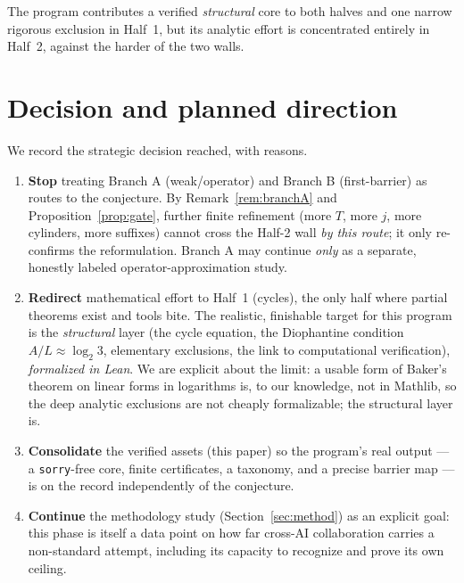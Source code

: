 \documentclass[11pt,a4paper]{article}
\theoremstyle{definition}
\begin{document}
The program contributes a verified \emph{structural} core to both halves
and one narrow rigorous exclusion in Half~1, but its analytic effort is
concentrated entirely in Half~2, against the harder of the two walls.

\section{Decision and planned direction}
\label{sec:decision}

We record the strategic decision reached, with reasons.

\begin{enumerate}[leftmargin=2em]
  \item \textbf{Stop} treating Branch A (weak/operator) and Branch B
        (first-barrier) as routes to the conjecture. By
        Remark~\ref{rem:branchA} and Proposition~\ref{prop:gate}, further
        finite refinement (more $T$, more $j$, more cylinders, more
        suffixes) cannot cross the Half-2 wall \emph{by this route}; it
        only re-confirms the reformulation. Branch A may continue \emph{only} as a separate,
        honestly labeled operator-approximation study.
  \item \textbf{Redirect} mathematical effort to Half~1 (cycles), the only
        half where partial theorems exist and tools bite. The realistic,
        finishable target for this program is the \emph{structural} layer
        (the cycle equation, the Diophantine condition $A/L \approx
        \log_2 3$, elementary exclusions, the link to computational
        verification), \emph{formalized in Lean}. We are explicit about
        the limit: a usable form of Baker's theorem on linear forms in
        logarithms is, to our knowledge, not in Mathlib, so the deep
        analytic exclusions are not cheaply formalizable; the structural
        layer is.
  \item \textbf{Consolidate} the verified assets (this paper) so the
        program's real output --- a \texttt{sorry}-free core, finite
        certificates, a taxonomy, and a precise barrier map --- is on the
        record independently of the conjecture.
  \item \textbf{Continue} the methodology study (Section~\ref{sec:method})
        as an explicit goal: this phase is itself a data point on how far
        cross-AI collaboration carries a non-standard attempt, including
        its capacity to recognize and prove its own ceiling.
\end{enumerate}
\end{document}
